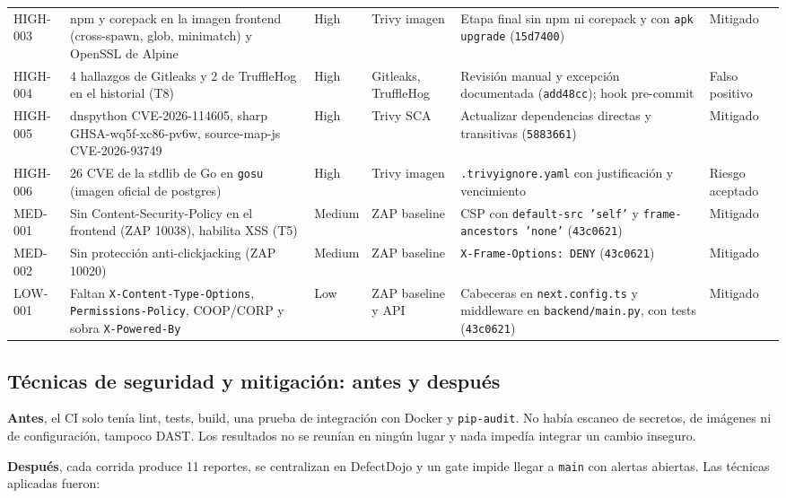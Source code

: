 \begin{table}[H]
\begin{tabularx}{\textwidth}{@{}L{1.25cm} Y L{1.25cm} L{1.65cm} Y L{1.55cm}@{}}
        HIGH-003 & npm y corepack en la imagen frontend (cross-spawn, glob, minimatch) y OpenSSL de Alpine & High & Trivy imagen & Etapa final sin npm ni corepack y con \texttt{apk upgrade} (\texttt{15d7400}) & Mitigado \\
        HIGH-004 & 4 hallazgos de Gitleaks y 2 de TruffleHog en el historial (T8) & High & Gitleaks, TruffleHog & Revisión manual y excepción documentada (\texttt{add48cc}); hook pre-commit & Falso positivo \\
        HIGH-005 & dnspython CVE-2026-114605, sharp GHSA-wq5f-xc86-pv6w, source-map-js CVE-2026-93749 & High & Trivy SCA & Actualizar dependencias directas y transitivas (\texttt{5883661}) & Mitigado \\
        HIGH-006 & 26 CVE de la stdlib de Go en \texttt{gosu} (imagen oficial de postgres) & High & Trivy imagen & \texttt{.trivyignore.yaml} con justificación y vencimiento & Riesgo aceptado \\
        MED-001 & Sin Content-Security-Policy en el frontend (ZAP 10038), habilita XSS (T5) & Medium & ZAP baseline & CSP con \texttt{default-src 'self'} y \texttt{frame-ancestors 'none'} (\texttt{43c0621}) & Mitigado \\
        MED-002 & Sin protección anti-clickjacking (ZAP 10020) & Medium & ZAP baseline & \texttt{X-Frame-Options: DENY} (\texttt{43c0621}) & Mitigado \\
        LOW-001 & Faltan \texttt{X-Content-Type-Options}, \texttt{Permissions-Policy}, COOP/CORP y sobra \texttt{X-Powered-By} & Low & ZAP baseline y API & Cabeceras en \texttt{next.config.ts} y middleware en \texttt{backend/main.py}, con tests (\texttt{43c0621}) & Mitigado \\
        \bottomrule
    \end{tabularx}
\end{table}

\subsection{Técnicas de seguridad y mitigación: antes y después}

\textbf{Antes}, el CI solo tenía lint, tests, build, una prueba de integración con Docker y \texttt{pip-audit}. No había escaneo de secretos, de imágenes ni de configuración, tampoco DAST. Los resultados no se reunían en ningún lugar y nada impedía integrar un cambio inseguro.

\textbf{Después}, cada corrida produce 11 reportes, se centralizan en DefectDojo y un gate impide llegar a \texttt{main} con alertas abiertas. Las técnicas aplicadas fueron:


